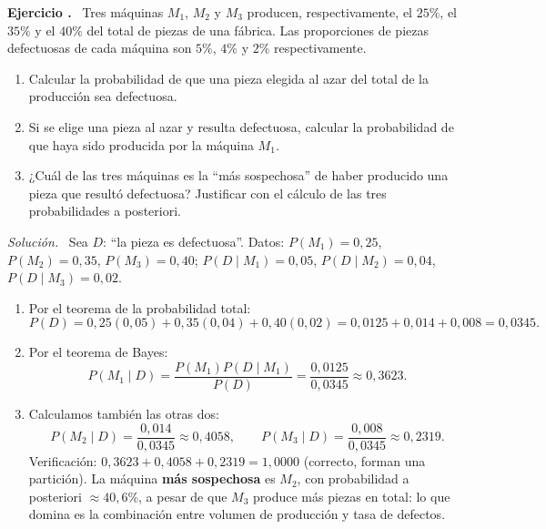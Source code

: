 \documentclass[11pt,a4paper]{article}
\newcounter{ejnum}
\newenvironment{ejercicio}{\refstepcounter{ejnum}\par\medskip\noindent\textbf{Ejercicio \theejnum.}~}{\par}
\newenvironment{solucion}{\par\noindent\textit{Solución.}~}{\par\vspace{1em}}
\begin{document}
\begin{ejercicio}
Tres máquinas $M_1$, $M_2$ y $M_3$ producen, respectivamente, el $25\%$, el $35\%$ y el $40\%$ del total de piezas de una fábrica. Las proporciones de piezas defectuosas de cada máquina son $5\%$, $4\%$ y $2\%$ respectivamente.
\begin{enumerate}[label=(\alph*)]
\item Calcular la probabilidad de que una pieza elegida al azar del total de la producción sea defectuosa.
\item Si se elige una pieza al azar y resulta defectuosa, calcular la probabilidad de que haya sido producida por la máquina $M_1$.
\item ¿Cuál de las tres máquinas es la ``más sospechosa'' de haber producido una pieza que resultó defectuosa? Justificar con el cálculo de las tres probabilidades a posteriori.
\end{enumerate}
\end{ejercicio}
\begin{solucion}
Sea $D$: ``la pieza es defectuosa''. Datos: $P(M_1)=0{,}25$, $P(M_2)=0{,}35$, $P(M_3)=0{,}40$; $P(D\mid M_1)=0{,}05$, $P(D\mid M_2)=0{,}04$, $P(D\mid M_3)=0{,}02$.
\begin{enumerate}[label=(\alph*)]
\item Por el teorema de la probabilidad total:
\[
P(D) = 0{,}25(0{,}05)+0{,}35(0{,}04)+0{,}40(0{,}02) = 0{,}0125+0{,}014+0{,}008 = 0{,}0345.
\]
\item Por el teorema de Bayes:
\[
P(M_1\mid D) = \frac{P(M_1)P(D\mid M_1)}{P(D)} = \frac{0{,}0125}{0{,}0345} \approx 0{,}3623.
\]
\item Calculamos también las otras dos:
\[
P(M_2\mid D) = \frac{0{,}014}{0{,}0345}\approx 0{,}4058, \qquad P(M_3\mid D) = \frac{0{,}008}{0{,}0345}\approx 0{,}2319.
\]
Verificación: $0{,}3623+0{,}4058+0{,}2319 = 1{,}0000$ (correcto, forman una partición). La máquina \textbf{más sospechosa} es $M_2$, con probabilidad a posteriori $\approx 40{,}6\%$, a pesar de que $M_3$ produce más piezas en total: lo que domina es la combinación entre volumen de producción y tasa de defectos.
\end{enumerate}
\end{solucion}
\end{document}
